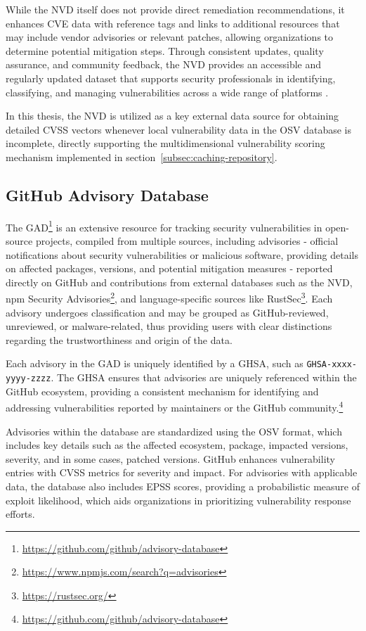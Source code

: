 While the \ac{NVD} itself does not provide direct remediation recommendations, it enhances \ac{CVE} data with reference tags and links to additional resources that may include vendor advisories or relevant patches, allowing organizations to determine potential mitigation steps. Through consistent updates, quality assurance, and community feedback, the \ac{NVD} provides an accessible and regularly updated dataset that supports security professionals in identifying, classifying, and managing vulnerabilities across a wide range of platforms \autocite{nist_nvd_2024}.

In this thesis, the \ac{NVD} is utilized as a key external data source for obtaining detailed \ac{CVSS} vectors whenever local vulnerability data in the \ac{OSV} database is incomplete, directly supporting the multidimensional vulnerability scoring mechanism implemented in section~\ref{subsec:caching-repository}.

\subsection{GitHub Advisory Database}
\label{subsec:github-advisory-database}

The \ac{GAD}\footnote{\url{https://github.com/github/advisory-database}} is an extensive resource for tracking security vulnerabilities in open-source projects, compiled from multiple sources, including advisories - official notifications about security vulnerabilities or malicious software, providing details on affected packages, versions, and potential mitigation measures - reported directly on GitHub and contributions from external databases such as the \ac{NVD}, npm Security Advisories\footnote{\url{https://www.npmjs.com/search?q=advisories}}, and language-specific sources like RustSec\footnote{\url{https://rustsec.org/}}. Each advisory undergoes classification and may be grouped as GitHub-reviewed, unreviewed, or malware-related, thus providing users with clear distinctions regarding the trustworthiness and origin of the data.

Each advisory in the \ac{GAD} is uniquely identified by a \ac{GHSA}, such as \texttt{GHSA-xxxx-yyyy-zzzz}. The \ac{GHSA} ensures that advisories are uniquely referenced within the GitHub ecosystem, providing a consistent mechanism for identifying and addressing vulnerabilities reported by maintainers or the GitHub community.\footnote{\url{https://github.com/github/advisory-database}}

Advisories within the database are standardized using the \ac{OSV} format, which includes key details such as the affected ecosystem, package, impacted versions, severity, and in some cases, patched versions. GitHub enhances vulnerability entries with \ac{CVSS} metrics for severity and impact. For advisories with applicable data, the database also includes \ac{EPSS} scores, providing a probabilistic measure of exploit likelihood, which aids organizations in prioritizing vulnerability response efforts.


